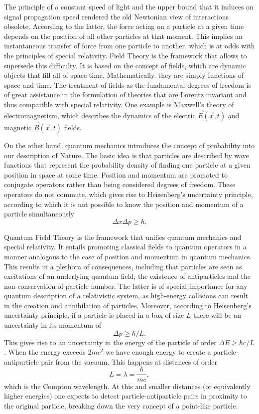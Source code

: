 The principle of a constant speed of light and the upper bound that it induces on signal propagation speed rendered the old Newtonian view of interactions obsolete. According to the latter, the force acting on a particle at a given time depends on the position of all other particles at that moment. This implies an instantaneous transfer of force from one particle to another, which is at odds with the principles of special relativity. Field Theory is the framework that allows to supersede this difficulty. It is based on the concept of fields, which are dynamic objects that fill all of space-time. Mathematically, they are simply functions of space and time. The treatment of fields as the fundamental degrees of freedom is of great assistance in the formulation  of theories that are Lorentz invariant and thus compatible with special relativity. One example is Maxwell's theory of electromagnetism, which describes the dynamics of the electric $\vec{E}(\vec{x},t)$ and magnetic $\vec{B}(\vec{x},t)$ fields.

On the other hand, quantum mechanics introduces the concept of probability into our description of Nature. The basic idea is that particles are described by wave functions that represent the probability density of finding one particle at a given position in space at some time. Position and momentum are promoted to conjugate operators rather than being considered degrees of freedom. These operators do not commute, which gives rise to Heisenberg's uncertainty principle, according to which it is not possible to know the position and momentum of a particle simultaneously
\begin{equation*}
\Delta x\Delta p\geq\hbar.
\end{equation*} 

Quantum Field Theory is the framework that unifies quantum mechanics and special relativity. It entails promoting classical fields to quantum operators in a manner analogous to the case of position and momentum in quantum mechanics. This results in a plethora of consequences, including that particles are seen as excitations of an underlying quantum field, the existence of antiparticles and the non-conservation of particle number. The latter is of special importance for any quantum description of a relativistic system, as high-energy collisions can result in the creation and annihilation of  particles. Moreover, according to Heisenberg's uncertainty principle, if a particle is placed in a box of size $L$ there will be an uncertainty in its momentum of
\begin{equation*}
\Delta p\geq\hbar/L.
\end{equation*}
This gives rise to an uncertainty in the energy of the particle of order $\Delta E\geq\hbar c/L$. When the energy exceeds $2mc^2$ we have enough energy to create a particle-antiparticle pair from the vacuum. This happens at distances of order 
\begin{equation*}
L=\lambda=\frac{\hbar}{mc},
\end{equation*}
which is the Compton wavelength. At this and smaller distances (or equivalently higher energies) one expects to detect particle-antiparticle pairs in proximity to the original particle, breaking down the very concept of a point-like particle. 

